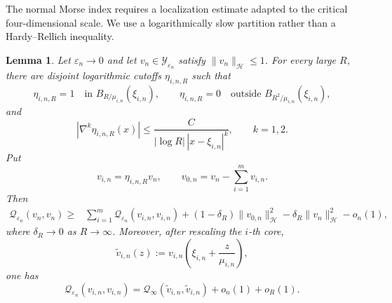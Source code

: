 \documentclass[11pt]{article}
\newtheorem{lemma}[theorem]{Lemma}
\numberwithin{equation}{section}
\begin{document}
The normal Morse index requires a localization estimate adapted to
the critical four-dimensional scale. We use a logarithmically slow
partition rather than a Hardy--Rellich inequality.

\begin{lemma}\label{lem:quadratic-localization}
Let $\varepsilon_n\to0$ and let
$v_n\in\mathcal Y_{\varepsilon_n}$ satisfy
$\|v_n\|_{\mathcal H}\leq1$. For every large $R$, there are disjoint
logarithmic cutoffs $\eta_{i,n,R}$ such that
\[
\eta_{i,n,R}=1
\quad\text{in }B_{R/\mu_{i,n}}(\xi_{i,n}),
\qquad
\eta_{i,n,R}=0
\quad\text{outside }B_{R^2/\mu_{i,n}}(\xi_{i,n}),
\]
and
\begin{equation}\label{eq:quadratic-localization-cutoff}
|\nabla^k\eta_{i,n,R}(x)|
\leq
\frac{C}{|\log R|\,|x-\xi_{i,n}|^k},
\qquad k=1,2.
\end{equation}
Put
\[
v_{i,n}=\eta_{i,n,R}v_n,
\qquad
v_{0,n}=v_n-\sum_{i=1}^m v_{i,n}.
\]
Then
\begin{equation}\label{eq:quadratic-localization}
\begin{aligned}
\mathcal Q_{\varepsilon_n}(v_n,v_n)
\geq{}&
\sum_{i=1}^m
\mathcal Q_{\varepsilon_n}(v_{i,n},v_{i,n})
+(1-\delta_R)\|v_{0,n}\|_{\mathcal H}^2 -\delta_R\|v_n\|_{\mathcal H}^2-o_n(1),
\end{aligned}
\end{equation}
where $\delta_R\to0$ as $R\to\infty$. Moreover, after rescaling the
$i$-th core,
\[
\widetilde v_{i,n}(z)
:=v_{i,n}\left(\xi_{i,n}+\frac z{\mu_{i,n}}\right),
\]
one has
\begin{equation}\label{eq:quadratic-core-limit}
\mathcal Q_{\varepsilon_n}(v_{i,n},v_{i,n})
=
\mathcal Q_\infty(\widetilde v_{i,n},\widetilde v_{i,n})
+o_n(1)+o_R(1).
\end{equation}
\end{lemma}
\end{document}
